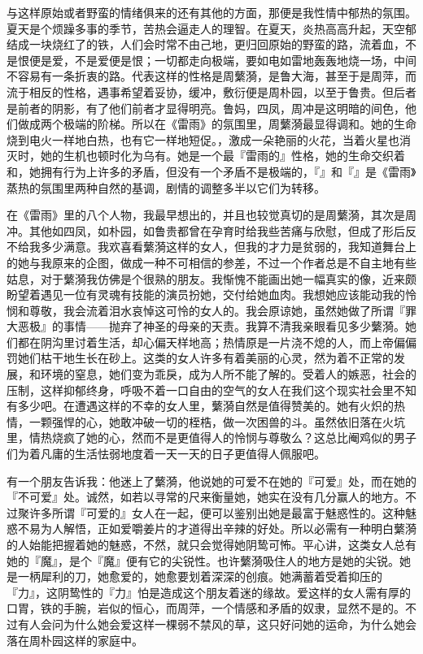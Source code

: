 与这样原始或者野蛮的情绪俱来的还有其他的方面，那便是我性情中郁热的氛围。夏天是个烦躁多事的季节，苦热会逼走人的理智。在夏天，炎热高高升起，天空郁结成一块烧红了的铁，人们会时常不由己地，更归回原始的野蛮的路，流着血，不是恨便是爱，不是爱便是恨；一切都走向极端，要如电如雷地轰轰地烧一场，中间不容易有一条折衷的路。代表这样的性格是周蘩漪，是鲁大海，甚至于是周萍，而流于相反的性格，遇事希望着妥协，缓冲，敷衍便是周朴园，以至于鲁贵。但后者是前者的阴影，有了他们前者才显得明亮。鲁妈，四凤，周冲是这明暗的间色，他们做成两个极端的阶梯。所以在《雷雨》的氛围里，周蘩漪最显得调和。她的生命烧到电火一样地白热，也有它一样地短促。，激成一朵艳丽的火花，当着火星也消灭时，她的生机也顿时化为乌有。她是一个最『雷雨的』性格，她的生命交织着和，她拥有行为上许多的矛盾，但没有一个矛盾不是极端的，『』和『』是《雷雨》蒸热的氛围里两种自然的基调，剧情的调整多半以它们为转移。

在《雷雨》里的八个人物，我最早想出的，并且也较觉真切的是周蘩漪，其次是周冲。其他如四凤，如朴园，如鲁贵都曾在孕育时给我些苦痛与欣慰，但成了形后反不给我多少满意。我欢喜看蘩漪这样的女人，但我的才力是贫弱的，我知道舞台上的她与我原来的企图，做成一种不可相信的参差，不过一个作者总是不自主地有些姑息，对于蘩漪我仿佛是个很熟的朋友。我惭愧不能画出她一幅真实的像，近来颇盼望着遇见一位有灵魂有技能的演员扮她，交付给她血肉。我想她应该能动我的怜悯和尊敬，我会流着泪水哀悼这可怜的女人的。我会原谅她，虽然她做了所谓『罪大恶极』的事情——抛弃了神圣的母亲的天责。我算不清我亲眼看见多少蘩漪。她们都在阴沟里讨着生活，却心偏天样地高；热情原是一片浇不熄的人，而上帝偏偏罚她们枯干地生长在砂上。这类的女人许多有着美丽的心灵，然为着不正常的发展，和环境的窒息，她们变为乖戾，成为人所不能了解的。受着人的嫉恶，社会的压制，这样抑郁终身，呼吸不着一口自由的空气的女人在我们这个现实社会里不知有多少吧。在遭遇这样的不幸的女人里，蘩漪自然是值得赞美的。她有火炽的热情，一颗强悍的心，她敢冲破一切的桎梏，做一次困兽的斗。虽然依旧落在火坑里，情热烧疯了她的心，然而不是更值得人的怜悯与尊敬么？这总比阉鸡似的男子们为着凡庸的生活怯弱地度着一天一天的日子更值得人佩服吧。

有一个朋友告诉我：他迷上了蘩漪，他说她的可爱不在她的『可爱』处，而在她的『不可爱』处。诚然，如若以寻常的尺来衡量她，她实在没有几分赢人的地方。不过聚许多所谓『可爱的』女人在一起，便可以鉴别出她是最富于魅惑性的。这种魅惑不易为人解悟，正如爱嚼姜片的才道得出辛辣的好处。所以必需有一种明白蘩漪的人始能把握着她的魅惑，不然，就只会觉得她阴鸷可怖。平心讲，这类女人总有她的『魔』，是个『魔』便有它的尖锐性。也许蘩漪吸住人的地方是她的尖锐。她是一柄犀利的刀，她愈爱的，她愈要划着深深的创痕。她满蓄着受着抑压的『力』，这阴鸷性的『力』怕是造成这个朋友着迷的缘故。爱这样的女人需有厚的口胃，铁的手腕，岩似的恒心，而周萍，一个情感和矛盾的奴隶，显然不是的。不过有人会问为什么她会爱这样一棵弱不禁风的草，这只好问她的运命，为什么她会落在周朴园这样的家庭中。

